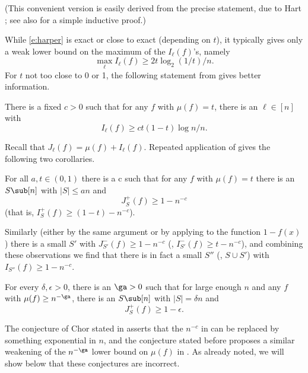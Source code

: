 \mn
(This convenient version is easily derived from the precise
statement, due to Hart \cite{Hart}; see also \cite[Sec. 7]{KK07}
for a simple inductive proof.)

\mn
While \eqref{e:harper} is exact or close to exact
(depending on $t$), it typically gives
only a weak lower bound on the maximum of the %
$I_\ell (f)$'s,   %
namely
\begin {equation}
\label {e:harper-max}
\max_\ell I_\ell (f) \ge  2t \log_2 (1/t)/n.
\end {equation}
For $t$ not too close to 0 or 1, the
following
statement from \cite{kkl} gives
better information.


\begin{thm} [KKL]
\label {t:kkl}
There is a fixed $c>0$ such that
for any
$f$ with $\mu(f) =t$,
there is an $\ell \in [n]$ with
\begin {equation}
\label {e:kkl}
I_\ell (f) \ge c t (1-t)\log n/n.
\end {equation}
\end {thm}
\nin
Recall that $J_\ell (f)=\mu(f) +I_\ell (f)$. Repeated application of  gives
the following two corollaries.

\begin {thm}
\label {t:ra1}
For all $a, t\in (0,1)$ there is a c such that
for any
$f$ with $\mu(f) =t$ there
is an $S\sub [n]$ with $|S|\leq an$ and
$$J^+_S(f) \ge 1 - n^{-c}$$ (that is,
$I^+_S(f) \ge (1-t) - n^{-c}$).

\end {thm}
\nin
Similarly (either by the same argument or by applying
 to the function $1-f(x)$)
there is a small $S'$
with
$J^-_{S'}(f) \ge 1 - n^{-c}$ (\ie, $I^-_{S'}(f) \ge t - n^{-c}$),
and combining these observations we find that there is
in fact a small $S''$ (\eg, $S \cup S'$) with
$I_{S''}(f) \ge 1-n^{-c}$.


\begin {thm}
\label {t:ra2}
For every $\delta, \epsilon >0$,
there is an $\ga>0$ such that for large enough
$n$ and any
$f$ with $\mu(f) \geq  n^{-\ga}$,
there is an $S\sub [n]$ with $|S|=\delta n$ and
 $$J^+_S(f) \ge 1-\epsilon.$$
\end {thm}


\mn
The conjecture of
Chor stated in 
asserts that the $n^{-c}$ in
 can be replaced
by something exponential in $n$,
and the conjecture stated before
 proposes a similar weakening
of the $n^{-\ga}$ lower bound on $\mu(f) $ in
.
As already noted, we
will show below that these conjectures are incorrect.



